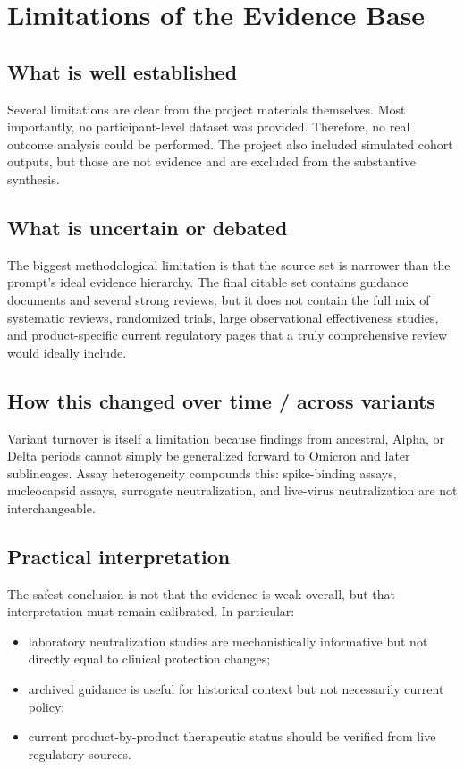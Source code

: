 \documentclass[12pt]{article}
\begin{document}
\section{Limitations of the Evidence Base}
\subsection*{What is well established}
Several limitations are clear from the project materials themselves. Most importantly, no participant-level dataset was provided. Therefore, no real outcome analysis could be performed. The project also included simulated cohort outputs, but those are not evidence and are excluded from the substantive synthesis.

\subsection*{What is uncertain or debated}
The biggest methodological limitation is that the source set is narrower than the prompt's ideal evidence hierarchy. The final citable set contains guidance documents and several strong reviews, but it does not contain the full mix of systematic reviews, randomized trials, large observational effectiveness studies, and product-specific current regulatory pages that a truly comprehensive review would ideally include.

\subsection*{How this changed over time / across variants}
Variant turnover is itself a limitation because findings from ancestral, Alpha, or Delta periods cannot simply be generalized forward to Omicron and later sublineages. Assay heterogeneity compounds this: spike-binding assays, nucleocapsid assays, surrogate neutralization, and live-virus neutralization are not interchangeable.

\subsection*{Practical interpretation}
The safest conclusion is not that the evidence is weak overall, but that interpretation must remain calibrated. In particular:
\begin{itemize}[leftmargin=1.5em]
    \item laboratory neutralization studies are mechanistically informative but not directly equal to clinical protection changes;
    \item archived guidance is useful for historical context but not necessarily current policy;
    \item current product-by-product therapeutic status should be verified from live regulatory sources.
\end{itemize}
\end{document}
